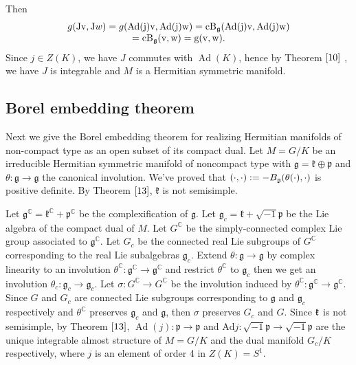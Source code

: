 Then
\[
\begin{array}{c}
	g(\mathrm{Jv}, \mathrm{J} w)=g(\mathrm{Ad}(\mathrm{j})
	\mathrm{v}, \operatorname{Ad}(\mathrm{j})
	\mathrm{w})=\mathrm{cB}_{{\mathfrak g}}(\mathrm{Ad}(\mathrm{j})
	\mathrm{v}, \mathrm{Ad}(\mathrm{j}) \mathrm{w}) \\
	=\mathrm{cB}_{{\mathfrak g}}(\mathrm{v},
	\mathrm{w})=\mathrm{g}(\mathrm{v}, \mathrm{w}) .
\end{array}
\]
Since $j \in Z(K)$, we have $J$ commutes with
$\operatorname{Ad}(K)$, hence by Theorem $\ref{10}$ , we have $J$
is integrable and $M$ is a Hermitian symmetric manifold.
\eproof
\subsection{Borel embedding theorem}

Next we give the Borel embedding theorem for realizing Hermitian
manifolds
of non-compact type as an open subset of its compact dual. Let
$M=G / K$ be an irreducible Hermitian symmetric manifold of
noncompact type with
$\mathfrak{g}=\mathfrak{k}\oplus\mathfrak{p}$ and $\theta:
\mathfrak{g} \rightarrow \mathfrak{g}$ the canonical involution.
We've proved that $(\cdot, \cdot):=-B_{{\mathfrak g}}(\theta(\cdot),
\cdot)$ is positive definite. By Theorem $\ref{13}$,
$\mathfrak{k}$ is not semisimple.



Let $\mathfrak{g}^{\mathbb{C}}=\mathfrak{k}^{\mathbb{C}}+
\mathfrak{p}^{\mathbb{C}}$ be the complexification of $\mathfrak{g}$. Let
$\mathfrak{g}_{c}=\mathfrak{k}+\sqrt{-1} \mathfrak{p}$ be the Lie
algebra of the compact dual of $M$. Let $G^{\mathbb{C}}$ be the
simply-connected complex Lie group associated to
$\mathfrak{g}^{\mathbb{C}}$. Let $G_{c}$ be the connected real
Lie subgroups of
$G^{\mathbb{C}}$ corresponding to the real Lie subalgebras
$\mathfrak{g}_{c}$. Extend $\theta: \mathfrak{g} \rightarrow
\mathfrak{g}$ by complex linearity to an involution
$\theta^{\mathbb{C}}: \mathfrak{g}^{\mathbb{C}} \rightarrow
\mathfrak{g}^{\mathbb{C}}$ and
restrict $\theta^{\mathbb{C}}$ to $\mathfrak{g}_{c}$ then we get
an involution $\theta_{c}: \mathfrak{g}_{c} \rightarrow
\mathfrak{g}_{c} .$ Let $\sigma: G^{\mathbb{C}} \rightarrow
G^{\mathbb{C}}$
be the involution induced by $\theta^{\mathbb{C}}:
\mathfrak{g}^{\mathbb{C}} \rightarrow \mathfrak{g}^{\mathbb{C}}$.
Since $G$ and $G_{c}$ are connected Lie subgroups corresponding
to $\mathfrak{g}$ and $\mathfrak{g}_{c}$ respectively and
$\theta^{\mathbb{C}}$ preserves $\mathfrak{g}_{c}$ and
$\mathfrak{g}$, then $\sigma$ preserves $G_{c}$ and $G$. Since
${\mathfrak k}$ is not semisimple, by Theorem $\ref{13}$,
$\operatorname{Ad}(j): \mathfrak{p} \rightarrow \mathfrak{p}$ and
$\mathrm{Ad} j: \sqrt{-1} \mathfrak{p} \rightarrow \sqrt{-1}
\mathfrak{p}$
are the unique integrable almost structure of $M=G / K$ and the
dual manifold $G_{c} / K$ respectively, where $j$ is an element
of order 4 in $Z(K)=S^{1}$.


